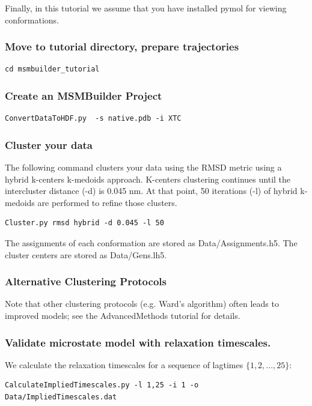 \documentclass[12pt]{article}
\begin{document}
Finally, in this tutorial we assume that you have installed pymol for viewing conformations.

\subsubsection{Move to tutorial directory, prepare trajectories}
\begin{verbatim}
cd msmbuilder_tutorial 
\end{verbatim}

\subsubsection{Create an MSMBuilder Project}
\begin{verbatim}
ConvertDataToHDF.py  -s native.pdb -i XTC
\end{verbatim}

\subsubsection{Cluster your data}
The following command clusters your data using the RMSD metric using a hybrid k-centers k-medoids approach.  K-centers clustering continues until the intercluster distance (-d) is 0.045 nm.  At that point, 50 iterations (-l) of hybrid k-medoids are performed to refine those clusters.

\begin{verbatim}
Cluster.py rmsd hybrid -d 0.045 -l 50
\end{verbatim}

The assignments of each conformation are stored as Data/Assignments.h5.  The cluster centers are stored as Data/Gens.lh5.  

\subsubsection{Alternative Clustering Protocols}

Note that other clustering protocols (e.g. Ward's algorithm) often leads to improved models; see the AdvancedMethods tutorial for details.  

\subsubsection{Validate microstate model with relaxation timescales.}
We calculate the relaxation timescales for a sequence of lagtimes $\{1, 2, ..., 25\}$:
\begin{verbatim}
CalculateImpliedTimescales.py -l 1,25 -i 1 -o Data/ImpliedTimescales.dat
\end{verbatim}
\end{document}
